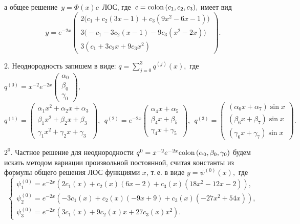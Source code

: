 \documentclass[11pt]{article}
\begin{document}
{%
а общее решение \,$y=\Phi(x)c$\, ЛОС, где \,$c={\rm colon}\,(c_1,c_2,c_3),$ имеет вид
\[
y=e^{-2x}\begin{pmatrix}
2\big(c_1 + c_2 (3x - 1) + c_3 (9x^2 - 6x - 1)\big) \\
3\big( -c_1-3c_2 (x-1) - 9c_3 (x^2 - 2x)\big) \\
3(c_1 + 3c_2x + 9c_3x^2)
\end{pmatrix}.
\]

2. Неоднородность %
запишем в виде:
$\displaystyle q=\sum_{j=0}^3 q^{(j)}(x),$ где $q^{(0)}=x^{-2}e^{-2x}\begin{pmatrix}\alpha_0\\ \beta_0\\ \gamma_0\end{pmatrix},$
%
$q^{(1)}=\begin{pmatrix} \alpha_1 x^2+\alpha_2 x+\alpha_3\\ \beta_1 x^2+\beta_2 x+\beta_3\\ \gamma_1 x^2+\gamma_2 x+\gamma_3 \end{pmatrix},\ \
q^{(2)}=e^{-2x} \begin{pmatrix} \alpha_4 x + \alpha_5 \\ \beta_4 x + \beta_5 \\ \gamma_4 x + \gamma_5 \end{pmatrix},\ \
q^{(3)}=\begin{pmatrix} (\alpha_6 x + \alpha_7) \sin x \\ (\beta_6 x + \beta_7) \sin x \\ (\gamma_6 x + \gamma_7) \sin x \end{pmatrix}.$

\smallskip
$2^0.$ Частное решение для неоднородности $q^{0} = x^{-2} e^{-2x} {\rm colon}\,(\alpha_0,\beta_0,\gamma_0)$
будем искать методом вариации произвольной постоянной, считая константы из формулы общего решения ЛОС функциями $x$,
т.\,е. в виде $y=\psi^{(0)}(x),$ где \[
\begin{cases}
\psi_1^{(0)} = e^{-2x} \left( 2c_1(x) + c_2(x)(6x - 2) + c_3(x)(18x^2 - 12x - 2) \right), \\
\psi_2^{(0)} = e^{-2x} \left( -3c_1(x) + c_2(x)(-9x + 9) + c_3(x)(-27x^2 + 54x) \right), \\
\psi_3^{(0)} = e^{-2x} \left( 3c_1(x) + 9c_2(x)x + 27c_3(x)x^2 \right).
\end{cases}
\]

}
\end{document}
